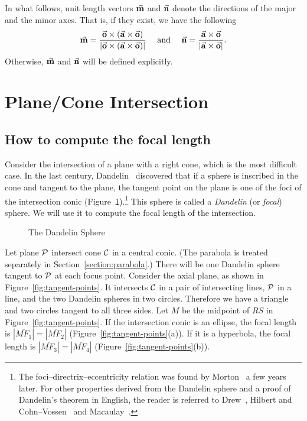      In what follows, unit length vectors $\vec{\bf m}$ and $\vec{\bf n}$ denote
the directions of the major and the minor axes.  That is, if they exist, 
we have the following
\[     \vec{\bf m} = \frac{\vec{\bf o}\times(\vec{\bf a}\times\vec{\bf o})}
                        {|\vec{\bf o}\times(\vec{\bf a}\times\vec{\bf o})|}
     \ \ \ \ \mbox{and}\ \ \ \  
     \vec{\bf n} = \frac{\vec{\bf a}\times\vec{\bf o}}
                        {|\vec{\bf a}\times\vec{\bf o}|}.   \]
Otherwise, $\vec{\bf m}$ and $\vec{\bf n}$ will be defined explicitly.



\section{Plane/Cone Intersection}
\label{section:cone}

\subsection{How to compute the focal length}
\label{ss:focal}

Consider the intersection of a plane with a right cone, which
is the most difficult case.
In the last century, Dandelin~\cite{dandelin:1822} discovered that if a 
sphere is inscribed in the cone and tangent to the plane, the tangent point 
on the plane is one of the foci of the intersection conic 
(Figure~\ref{dandelin-sphere}).\footnote{The foci--directrix--eccentricity 
     relation was found by Morton~\cite{morton:1830} a few years later.
     For other properties derived from the Dandelin
     sphere and a proof of Dandelin's theorem in English,
     the reader is referred to
     Drew~\cite{drew:1875}, Hilbert and Cohn--Vossen~\cite{hilbert:1983}
     and Macaulay~\cite{macaulay:1895}.}
This sphere is called a {\em Dandelin} (or {\em focal}) sphere. 
We will use it to compute the focal length of the intersection.
\begin{figure}
\vspace{3.25in}
\caption{The Dandelin Sphere}
\label{dandelin-sphere}
\end{figure}

Let plane ${\cal P}$ intersect cone ${\cal C}$ in a central conic.  
(The parabola is treated separately in Section~\ref{section:parabola}.)
There will be one Dandelin sphere tangent to ${\cal P}$ at each focus point.  
Consider the axial plane, as shown in Figure~\ref{fig:tangent-points}.
It intersects ${\cal C}$ in a pair of intersecting lines, ${\cal P}$ in a 
line, and the two Dandelin spheres in two circles.  
Therefore we have a triangle and two circles tangent to all three sides.
Let $M$ be the midpoint of $\overline{RS}$ in Figure~\ref{fig:tangent-points}.
If the intersection conic is an ellipse, the focal length is 
$|\overline{MF_1}|=|\overline{MF_2}|$ (Figure~\ref{fig:tangent-points}(a)).
If it is a hyperbola, the focal length is $|\overline{MF_3}|=|\overline{MF_4}|$
(Figure~\ref{fig:tangent-points}(b)).

